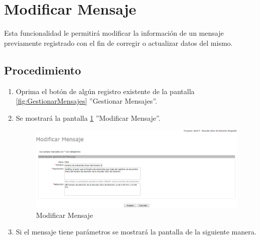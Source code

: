 \hypertarget{cv:modificarMensaje}{\section{Modificar Mensaje}} \label{sec:modificarMensaje}

	Esta funcionalidad le permitirá modificar la información de un mensaje previamente registrado con el fin de corregir o actualizar datos del mismo. 

		\subsection{Procedimiento}

			\begin{enumerate}
	
			\item Oprima el botón \IUEditar{} de algún registro existente de la pantalla \ref{fig:GestionarMensajes} ''Gestionar Mensajes''.
	
			\item Se mostrará la pantalla \ref{fig:modificarMensaje} ''Modificar Mensaje''.
			
			\begin{figure}[H]
				\begin{center}
					\includegraphics[scale=0.5]{roles/lider/mensajes/pantallas/IU9-2modificarMensaje}
					\caption{Modificar Mensaje}
					\label{fig:modificarMensaje}
				\end{center}
			\end{figure}
		
			
			\item Si el mensaje tiene parámetros se mostrará la pantalla de la siguiente manera.
			

\end{enumerate}
